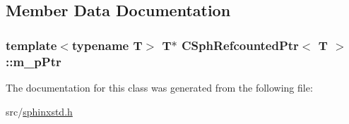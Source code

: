 \subsection{Member Data Documentation}
\hypertarget{classCSphRefcountedPtr_ac8a06f97ff0fe3545c736650dedb4b69}{
\subsubsection[{m\-\_\-p\-Ptr}]{\setlength{\rightskip}{0pt plus 5cm}template$<$typename T$>$ T$\ast$ {\bf C\-Sph\-Refcounted\-Ptr}$<$ T $>$\-::m\-\_\-p\-Ptr\hspace{0.3cm}{\ttfamily [protected]}}}\label{classCSphRefcountedPtr_ac8a06f97ff0fe3545c736650dedb4b69}


The documentation for this class was generated from the following file\-:\begin{DoxyCompactItemize}
\item 
src/\hyperlink{sphinxstd_8h}{sphinxstd.\-h}\end{DoxyCompactItemize}

